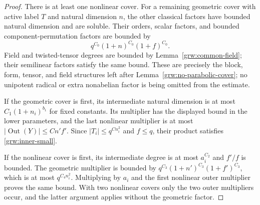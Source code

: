 \begin{proof}
There is at least one nonlinear cover.  For a remaining geometric
cover with active label $T$ and natural dimension $n$, the other
classical factors have bounded natural dimension and are soluble.
Their orders, scalar factors, and bounded component-permutation factors
are bounded by
\[
 q^{C_0}(1+n)^{C_0}(1+f)^{C_0}.
\]
Field and twisted-tensor degrees are bounded by
Lemma~\ref{grw:common-field}; their semilinear factors satisfy the same
bound.  These are precisely the block, form, tensor, and field
structures left after Lemma~\ref{grw:no-parabolic-cover}; no unipotent
radical or extra nonabelian factor is being omitted from the estimate.

If the geometric cover is first, its intermediate natural dimension
is at most $C_1(1+n_i)^{b_1}$ for fixed constants.  Its multiplier has
the displayed bound in the lower parameters, and the last nonlinear
multiplier is at most $|\operatorname{Out}(Y)|\le Cn'f'$.
Since $|T_i|\le q^{C n_i^2}$ and $f\le q$, their product satisfies
\eqref{grw:inner-small}.

If the nonlinear cover is first, its intermediate degree is at most
$a_i^{C_2}$ and $f'/f$ is bounded.  The geometric multiplier is bounded
by $q^{C_3}(1+n')^{C_3}(1+f')^{C_3}$, which is at most
$q^{C_4 n_i^2}$.  Multiplying by $a_i$ and the first nonlinear
outer multiplier proves the same bound.  With two nonlinear covers
only the two outer multipliers occur, and the latter argument applies
without the geometric factor.
\end{proof}

